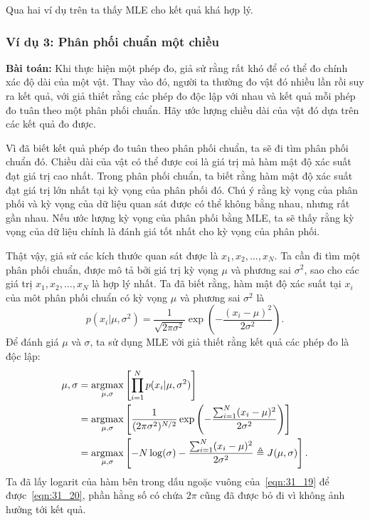 Qua hai ví dụ trên ta thấy MLE cho kết quả khá hợp lý.


\subsubsection{Ví dụ 3: Phân phối chuẩn một chiều}
\label{sssec:gassian_mle}

\textbf{Bài toán:} Khi thực hiện một phép đo, giả sử rằng rất khó để có thể đo
{chính xác} độ dài của một vật. Thay vào đó, người ta thường đo vật đó
nhiều lần rồi suy ra kết quả, với giả thiết rằng các phép đo độc lập với nhau
và kết quả mỗi phép đo tuân theo một phân phối chuẩn. Hãy ước lượng chiều dài của vật đó
dựa trên các kết quả đo được.

\lg

Vì đã biết kết quả phép đo tuân theo phân phối chuẩn, ta sẽ đi tìm phân phối
chuẩn đó. Chiều dài của vật có thể được coi là giá trị mà hàm mật độ xác suất
đạt giá trị cao nhất. Trong phân phối chuẩn, ta biết rằng hàm mật độ xác suất
đạt giá trị lớn nhất tại kỳ vọng của phân phối đó. Chú ý rằng kỳ vọng của phân
phối và kỳ vọng của dữ liệu quan sát được có thể không bằng nhau, nhưng rất gần
nhau. Nếu ước lượng kỳ vọng của phân phối bằng MLE, ta sẽ thấy rằng kỳ vọng của
dữ liệu chính là đánh giá tốt nhất cho kỳ vọng của phân phối.

Thật vậy, giả sử các kích thước quan sát được là $x_1, x_2, \dots, x_N$. Ta cần
đi tìm một phân phối chuẩn, được mô tả bởi giá trị kỳ vọng $\mu$ và phương
sai $\sigma^2$, sao cho các giá trị $x_1, x_2, \dots, x_N$ là hợp lý nhất. Ta đã biết rằng, hàm mật độ xác suất tại $x_i$ của môt phân phối chuẩn có
kỳ vọng $\mu$ và phương sai $\sigma^2$ là
\begin{equation}
p(x_i | \mu, \sigma^2) = \frac{1}{\sqrt{2\pi \sigma^2}} \exp\left(-\frac{(x_i - \mu)^2}{2\sigma^2}\right).
\end{equation}
Để đánh giá $\mu$ và $\sigma$, ta sử dụng MLE với giả thiết rằng kết quả
các phép đo là độc lập:
\begin{alignat}{3}
\label{eqn:31_18}
\mu, \sigma & =
\operatorname*{argmax}_{\mu, \sigma} \left[ \prod_{i=1}^N p(x_i | \mu,
\sigma^2)\right]\\\
\label{eqn:31_19}
& =  \operatorname*{argmax}_{\mu, \sigma} \left[ \frac{1}{(2\pi \sigma^2)^{N/2}} \exp\left(-\frac{\sum_{i=1}^N (x_i - \mu)^2}{2\sigma^2} \right) \right]\\\
\label{eqn:31_20}
& =  \operatorname*{argmax}_{\mu, \sigma}\left[ -N\log(\sigma) - \frac{\sum_{i=1}^N (x_i - \mu)^2}{2\sigma^2} \triangleq J(\mu, \sigma) \right].
\end{alignat}
Ta đã lấy logarit của hàm bên trong dấu ngoặc vuông của~\eqref{eqn:31_19} để
được~\eqref{eqn:31_20}, phần hằng số có chứa $2\pi$ cũng đã được bỏ đi vì
không ảnh hưởng tới kết quả.

